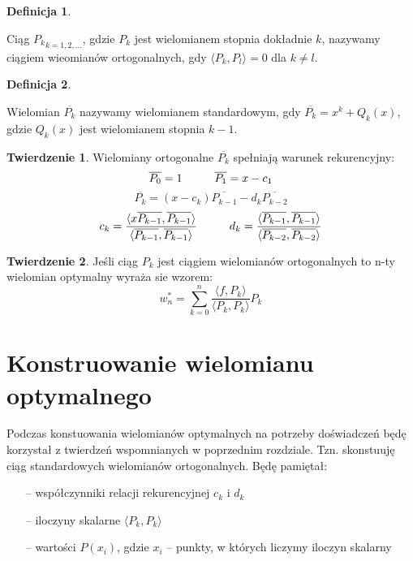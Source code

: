 \documentclass[a4paper]{article}
\theoremstyle{definition}
\newtheorem*{definition}{Definicja}
\theoremstyle{theorem}
\newtheorem*{theorem}{Twierdzenie}
\begin{document}
\begin{definition}~

  Ciąg ${P_k}_{k=1,2,...}$, gdzie $P_k$ jest wielomianem stopnia dokładnie $k$,
  nazywamy ciągiem wieomianów ortogonalnych, gdy $\langle P_k, P_l\rangle = 0$ dla
  $k \neq l$.
\end{definition}

\begin{definition}~

  Wielomian $\overline{P_k}$ nazywamy wielomianem standardowym, gdy $\overline{P_k} = x^k + 
  Q_k(x)$, gdzie $Q_k(x)$ jest wielomianem stopnia $k-1$.
\end{definition}

\begin{theorem}
  Wielomiany ortogonalne ${\overline{P_k}}$ spełniają warunek rekurencyjny:
  $$ \overline{P_0} = 1 \text{\hspace{1cm}} \overline{P_1} = x - c_1$$
  $$ \overline{P_k} = (x - c_k)\overline{P_{k-1}} - d_k\overline{P_{k-2}}$$
  $$ c_k = \frac{\langle x\overline{P_{k-1}}, \overline{P_{k-1}}\rangle}
                {\langle \overline{P_{k-1}}, \overline{P_{k-1}}\rangle} \text{\hspace{1cm}}
     d_k = \frac{\langle \overline{P_{k-1}}, \overline{P_{k-1}}\rangle}
                {\langle \overline{P_{k-2}}, \overline{P_{k-2}}\rangle} $$
\end{theorem}

\begin{theorem}
  Jeśli ciąg ${P_k}$ jest ciągiem wielomianów ortogonalnych to n-ty wielomian 
  optymalny wyraża sie wzorem:
  $$ w_n^* = \sum_{k=0}^n \frac{\langle f, P_k\rangle}{\langle P_k,P_k\rangle}P_k$$
\end{theorem}

\section{Konstruowanie wielomianu optymalnego}
Podczas konstuowania wielomianów optymalnych na potrzeby doświadczeń będę
korzystał z twierdzeń wspomnianych w poprzednim rozdziale. Tzn. skonstuuję ciąg 
standardowych wielomianów ortogonalnych. Będę pamiętał:
\begin{itemize}
  \item[--] współczynniki relacji rekurencyjnej $c_k$ i $d_k$
  \item[--] iloczyny skalarne $\langle P_k,P_k\rangle$
  \item[--] wartości $P(x_i)$, gdzie $x_i$ -- punkty, w których liczymy iloczyn skalarny
\end{itemize}
\end{document}
